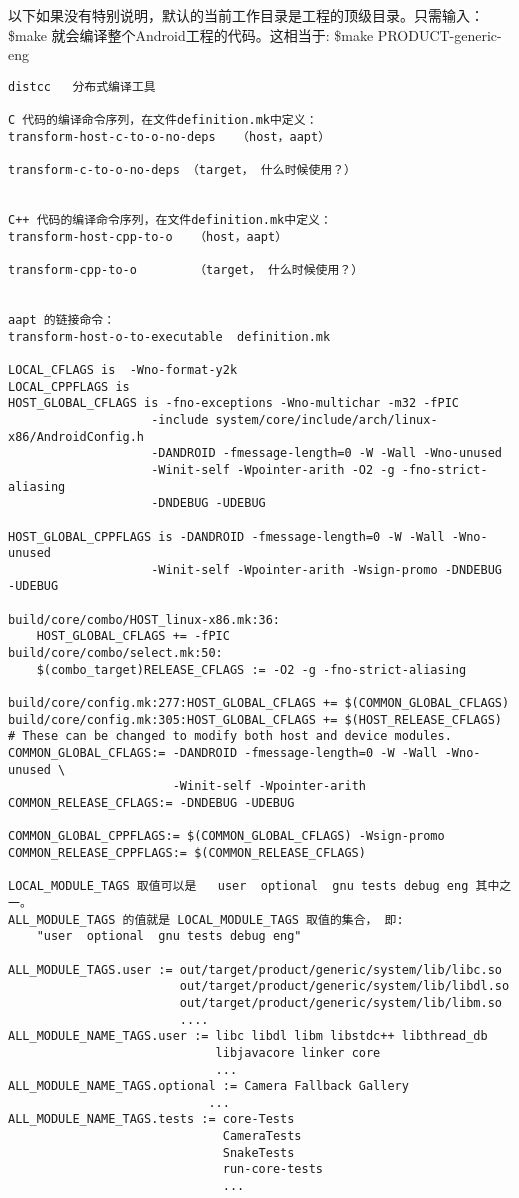 \documentclass[a4paper,titlepage]{article}
\begin{document}
以下如果没有特别说明，默认的当前工作目录是工程的顶级目录。只需输入：
\vbox{\$make } 就会编译整个Android工程的代码。这相当于:
\vbox{\$make PRODUCT-generic-eng}

\begin{verbatim}
distcc   分布式编译工具

C 代码的编译命令序列，在文件definition.mk中定义：
transform-host-c-to-o-no-deps   （host，aapt）

transform-c-to-o-no-deps （target， 什么时候使用？）


C++ 代码的编译命令序列，在文件definition.mk中定义：
transform-host-cpp-to-o   （host，aapt）

transform-cpp-to-o        （target， 什么时候使用？）


aapt 的链接命令：
transform-host-o-to-executable  definition.mk

LOCAL_CFLAGS is  -Wno-format-y2k
LOCAL_CPPFLAGS is 
HOST_GLOBAL_CFLAGS is -fno-exceptions -Wno-multichar -m32 -fPIC
                    -include system/core/include/arch/linux-x86/AndroidConfig.h
                    -DANDROID -fmessage-length=0 -W -Wall -Wno-unused 
                    -Winit-self -Wpointer-arith -O2 -g -fno-strict-aliasing 
                    -DNDEBUG -UDEBUG

HOST_GLOBAL_CPPFLAGS is -DANDROID -fmessage-length=0 -W -Wall -Wno-unused
                    -Winit-self -Wpointer-arith -Wsign-promo -DNDEBUG -UDEBUG

build/core/combo/HOST_linux-x86.mk:36:
    HOST_GLOBAL_CFLAGS += -fPIC
build/core/combo/select.mk:50:
    $(combo_target)RELEASE_CFLAGS := -O2 -g -fno-strict-aliasing

build/core/config.mk:277:HOST_GLOBAL_CFLAGS += $(COMMON_GLOBAL_CFLAGS)
build/core/config.mk:305:HOST_GLOBAL_CFLAGS += $(HOST_RELEASE_CFLAGS)
# These can be changed to modify both host and device modules.
COMMON_GLOBAL_CFLAGS:= -DANDROID -fmessage-length=0 -W -Wall -Wno-unused \
                       -Winit-self -Wpointer-arith
COMMON_RELEASE_CFLAGS:= -DNDEBUG -UDEBUG

COMMON_GLOBAL_CPPFLAGS:= $(COMMON_GLOBAL_CFLAGS) -Wsign-promo
COMMON_RELEASE_CPPFLAGS:= $(COMMON_RELEASE_CFLAGS)

LOCAL_MODULE_TAGS 取值可以是   user  optional  gnu tests debug eng 其中之一。
ALL_MODULE_TAGS 的值就是 LOCAL_MODULE_TAGS 取值的集合， 即:
    "user  optional  gnu tests debug eng"

ALL_MODULE_TAGS.user := out/target/product/generic/system/lib/libc.so
                        out/target/product/generic/system/lib/libdl.so
                        out/target/product/generic/system/lib/libm.so
                        ....
ALL_MODULE_NAME_TAGS.user := libc libdl libm libstdc++ libthread_db
                             libjavacore linker core
                             ...
ALL_MODULE_NAME_TAGS.optional := Camera Fallback Gallery 
                            ...
ALL_MODULE_NAME_TAGS.tests := core-Tests
                              CameraTests
                              SnakeTests
                              run-core-tests
                              ...
\end{verbatim}
\end{document}
